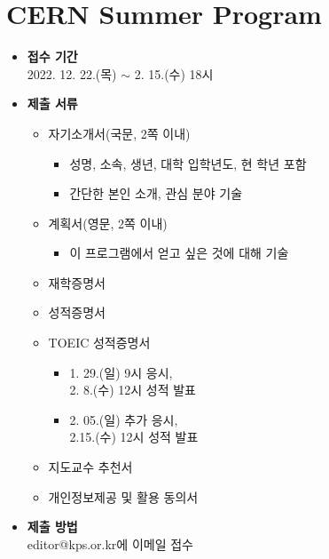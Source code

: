 \documentclass[aps,reprint,superscriptaddress,11pt]{revtex4-2}
\begin{document}
\section{CERN Summer Program}
\begin{itemize}
  \item{\bf 접수 기간}\\ 2022. 12. 22.(목) $\sim$ 2. 15.(수) 18시
  \item{\bf 제출 서류} 
  \begin{itemize}
    \item 자기소개서(국문, 2쪽 이내)
    \begin{itemize}\tiny
      \item 성명, 소속, 생년, 대학 입학년도, 현 학년 포함
      \item 간단한 본인 소개, 관심 분야 기술
    \end{itemize}
    \item 계획서(영문, 2쪽 이내)
    \begin{itemize}\tiny
      \item 이 프로그램에서 얻고 싶은 것에 대해 기술
    \end{itemize}
    \item 재학증명서
    \item 성적증명서
    \item TOEIC 성적증명서
    \begin{itemize}\footnotesize
      \item 1. 29.(일) 9시 응시,\\ 2. 8.(수) 12시 성적 발표
      \item 2. 05.(일) 추가 응시,\\ 2.15.(수) 12시 성적 발표
    \end{itemize}
    \item 지도교수 추천서
    \item 개인정보제공 및 활용 동의서
  \end{itemize}
  \item{\bf 제출 방법}\\
  editor@kps.or.kr에 이메일 접수
\end{itemize}
\end{document}
